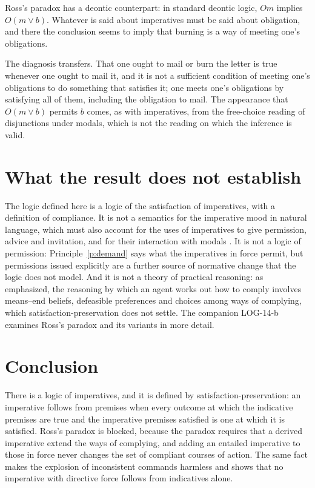 \documentclass{situationist-preprint}
\begin{document}
\begin{objection}
Ross's paradox has a deontic counterpart: in standard deontic logic, $O m$ implies $O(m \vee b)$. Whatever is said about imperatives must be said about obligation, and there the conclusion seems to imply that burning is a way of meeting one's obligations.
\end{objection}

\begin{reply}
The diagnosis transfers. That one ought to mail or burn the letter is true whenever one ought to mail it, and it is not a sufficient condition of meeting one's obligations to do something that satisfies it; one meets one's obligations by satisfying all of them, including the obligation to mail. The appearance that $O(m \vee b)$ permits $b$ comes, as with imperatives, from the free-choice reading of disjunctions under modals, which is not the reading on which the inference is valid.
\end{reply}

\section{What the result does not establish}

The logic defined here is a logic of the satisfaction of imperatives, with a definition of compliance. It is not a semantics for the imperative mood in natural language, which must also account for the uses of imperatives to give permission, advice and invitation, and for their interaction with modals \citep{Charlow2014}. It is not a logic of permission: Principle~\ref{p:demand} says what the imperatives in force permit, but permissions issued explicitly are a further source of normative change that the logic does not model. And it is not a theory of practical reasoning: as \citet{Williams1963} emphasized, the reasoning by which an agent works out how to comply involves means--end beliefs, defeasible preferences and choices among ways of complying, which satisfaction-preservation does not settle. The companion LOG-14-b examines Ross's paradox and its variants in more detail.

\section{Conclusion}

There is a logic of imperatives, and it is defined by satisfaction-preservation: an imperative follows from premises when every outcome at which the indicative premises are true and the imperative premises satisfied is one at which it is satisfied. Ross's paradox is blocked, because the paradox requires that a derived imperative extend the ways of complying, and adding an entailed imperative to those in force never changes the set of compliant courses of action. The same fact makes the explosion of inconsistent commands harmless and shows that no imperative with directive force follows from indicatives alone.
\end{document}
